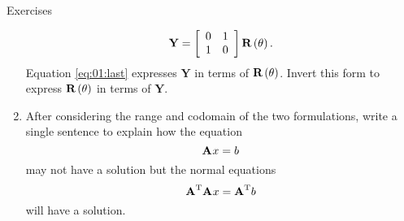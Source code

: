 \begin{xcb}{Exercises}
\begin{enumerate}
\begin{equation}
  \textbf{Y} = \left[\begin{array}{cc} 0 & 1 \\ 1 & 0 \end{array}\right] \operatorname{\textbf{R}\left( \theta \right)}.
  \label{eq:01:last}
\end{equation}
Equation \eqref{eq:01:last} expresses $ \textbf{Y} $ in terms of $ \operatorname{\textbf{R}\left( \theta \right)} $. Invert this form to express $ \operatorname{\textbf{R}\left( \theta \right)} $ in terms of $ \textbf{Y} $.
\item After considering the range and codomain of the two formulations, write a single sentence to explain how the equation
\begin{equation}
  \textbf{A}^{\mathrm{}}x=b
\end{equation}
may not have a solution but the normal equations
\begin{equation}
  \textbf{A}^{\mathrm{T}}\textbf{A}^{\mathrm{}}x=\textbf{A}^{\mathrm{T}}b
\end{equation}
will have a solution. 
\end{enumerate}

\end{xcb}

\endinput